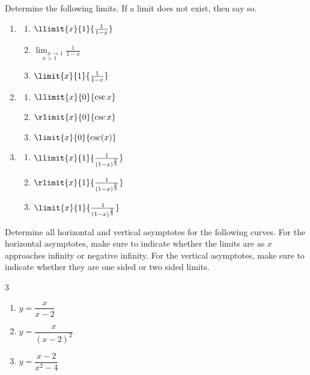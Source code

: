 \begin{ProblemSection}
  \begin{embeddedproblem}{}
    Determine the following limits. If a limit does not exist, then
    say so.
    \begin{enumerate}
    \item
      \begin{enumerate}
      \item[$(\ast)$]
$\llimit{x}{1}{\frac{1}{1-x}}$
\item[$(\ast\ast)$]
        $\displaystyle\underset{x>1}{\lim_{x\rightarrow1}}\frac{1}{1-x}$
      \item[$(\ast\ast\ast)$]
        $\limit{x}{1}{\frac{1}{1-x}}$
      \end{enumerate}
    \item
      \begin{enumerate}
      \item[$(\ast)$]
        $\llimit{x}{0}{\csc{x}}$
      \item[$(\ast\ast)$]
        $\rlimit{x}{0}{\csc{x}}$
      \item[$(\ast\ast\ast)$]
        $\limit{x}{0}{\csc(x)}$
      \end{enumerate}
    \item
      \begin{enumerate}
      \item[$(\ast)$]
        $\llimit{x}{1}{\frac{1}{(1-x)^{\frac23}}}$
      \item[$(\ast\ast)$]
        $\rlimit{x}{1}{\frac{1}{(1-x)^{\frac23}}}$
      \item[$(\ast\ast\ast)$]
        $\limit{x}{1}{\frac{1}{(1-x)^{\frac23}}}$
      \end{enumerate}
    \end{enumerate}
  \end{embeddedproblem}

  \begin{embeddedproblem}{}
    	Determine all horizontal and vertical asymptotes for the
        following curves. For the horizontal asymptotes, make sure to
        indicate whether the limits are as $x$ approaches infinity or
        negative infinity.  For the vertical asymptotes, make sure to
        indicate whether they are one sided or two sided limits.
        \begin{multicols}{3}
          \begin{enumerate}[label={\bf{}(\alph*)}]
          \item $y=\dfrac{x}{x-2}$
          \item $y=\dfrac{x}{(x-2)^2}$
          \item $y=\dfrac{x-2}{x^2-4}$
          \end{enumerate}
        \end{multicols}
      \end{embeddedproblem}
\end{ProblemSection}

